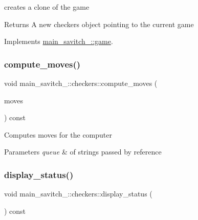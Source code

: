 creates a clone of the game \begin{DoxyReturn}{Returns}
A new checkers object pointing to the current game 
\end{DoxyReturn}


Implements \hyperlink{classmain__savitch__14_1_1game}{main\+\_\+savitch\+\_\+::game}.

\mbox{\label{classmain__savitch__14_1_1checkers_aa4b4867ee171d04f5473f4ca38a9729a}} 
\subsubsection{\texorpdfstring{compute\+\_\+moves()}{compute\_moves()}}
{\footnotesize\ttfamily void main\+\_\+savitch\+\_\+::checkers\+::compute\+\_\+moves (\begin{DoxyParamCaption}\item[{queue$<$ string $>$ \&}]{moves }\end{DoxyParamCaption}) const}

Computes moves for the computer 
\begin{DoxyParams}{Parameters}
{\em queue} & of strings passed by reference \\
\hline
\end{DoxyParams}
\mbox{\label{classmain__savitch__14_1_1checkers_aa99f69ed300d81b6340f87b59ebba031}} 
\subsubsection{\texorpdfstring{display\+\_\+status()}{display\_status()}}
{\footnotesize\ttfamily void main\+\_\+savitch\+\_\+::checkers\+::display\+\_\+status (\begin{DoxyParamCaption}{ }\end{DoxyParamCaption}) const\hspace{0.3cm}{\ttfamily [virtual]}}

